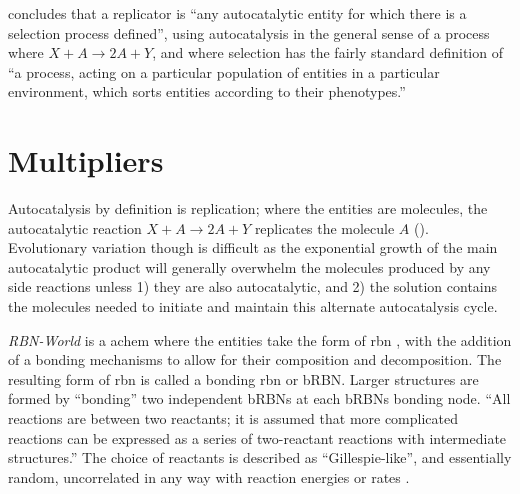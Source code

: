 
\Cite{Zachar2010} concludes that a replicator is ``any autocatalytic entity for which there is a selection process defined'', using autocatalysis in the general sense of a process where $X + A\rightarrow 2A + Y$, and where selection has the fairly standard definition of ``a process, acting on a particular population of entities in a particular environment, which sorts entities according to their phenotypes.'' \parencite[p.21]{Zachar2010}

\section{Multipliers}

Autocatalysis by definition is replication; where the entities are molecules, the autocatalytic reaction $X + A\rightarrow 2A + Y$ replicates the molecule $A$ (\eg \cite{Zachar2010,Lifson1997}). Evolutionary variation though is difficult as the exponential growth of the main autocatalytic product will generally overwhelm the molecules produced by any side reactions unless 1) they are also autocatalytic, and 2) the solution contains the molecules needed to initiate and maintain this alternate autocatalysis cycle.


\emph{RBN-World} \parencite{Faulconbridge2011} is a \gls{achem} where the entities take the form of \gls{rbn} \parencite{Kauffman:1969ne}, with the addition of a bonding mechanisms to allow for their composition and decomposition. The resulting form of \gls{rbn} is called a bonding \gls{rbn} or bRBN.  Larger structures are formed by ``bonding'' two independent bRBNs at each bRBNs bonding node. ``All reactions are between two reactants; it is assumed that more complicated reactions can be expressed as a series of two-reactant reactions with intermediate structures.'' The choice of reactants is described as ``Gillespie-like'', and essentially random, uncorrelated in any way with reaction energies or rates \parencite[chap.8]{Faulconbridge2011}.

